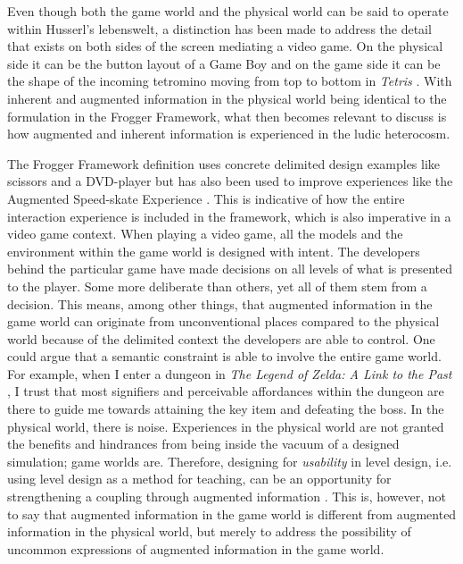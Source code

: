Even though both the game world and the physical world can be said to operate within Husserl's lebenswelt, a distinction has been made to address the detail that exists on both sides of the screen mediating a video game. On the physical side it can be the button layout of a Game Boy and on the game side it can be the shape of the incoming tetromino moving from top to bottom in \textit{Tetris} \cite{tetris}. With inherent and augmented information in the physical world being identical to the formulation in the Frogger Framework, what then becomes relevant to discuss is how augmented and inherent information is experienced in the ludic heterocosm.

The Frogger Framework definition uses concrete delimited design examples like scissors and a DVD-player \cite{frogger} but has also been used to improve experiences like the Augmented Speed-skate Experience \cite{transbehav}. This is indicative of how the entire interaction experience is included in the framework, which is also imperative in a video game context. When playing a video game, all the models and the environment within the game world is designed with intent. The developers behind the particular game have made decisions on all levels of what is presented to the player. Some more deliberate than others, yet all of them stem from a decision. This means, among other things, that augmented information in the game world can originate from unconventional places compared to the physical world because of the delimited context the developers are able to control. One could argue that a semantic constraint is able to involve the entire game world. For example, when I enter a dungeon in \textit{The Legend of Zelda: A Link to the Past} \cite{linktothepast}, I trust that most signifiers and perceivable affordances within the dungeon are there to guide me towards attaining the key item and defeating the boss. In the physical world, there is noise. Experiences in the physical world are not granted the benefits and hindrances from being inside the vacuum of a designed simulation; game worlds are. Therefore, designing for \textit{usability} in level design, i.e. using level design as a method for teaching, can be an opportunity for strengthening a coupling through augmented information \cite{totten}. This is, however, not to say that augmented information in the game world is different from augmented information in the physical world, but merely to address the possibility of uncommon expressions of augmented information in the game world.

